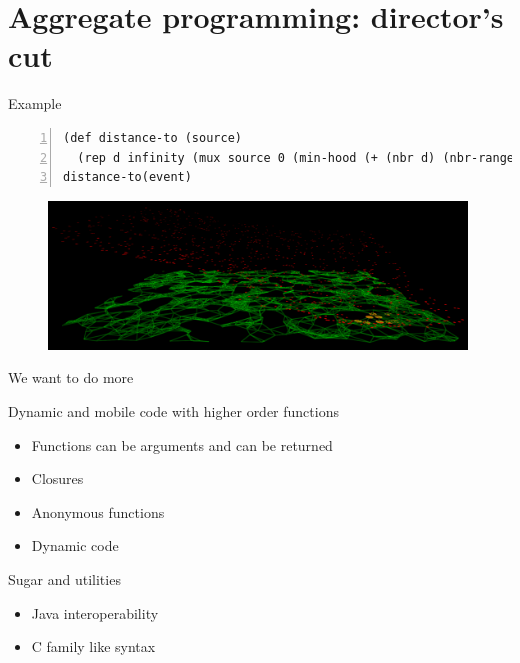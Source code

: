 \documentclass[presentation]{beamer}\mode<presentation>{\usetheme{sapere}}
\begin{document}
\section*{Aggregate programming: director's cut}

\begin{frame}[fragile]{Example}
    \scriptsize
    \begin{lstlisting}[mathescape,morekeywords={rep,mux,sense,inf,def,min,hood,nbr,nbr,range,else,if,Infinity},numbers=left,basicstyle=\ttfamily]
(def distance-to (source)
  (rep d infinity (mux source 0 (min-hood (+ (nbr d) (nbr-range))))))
distance-to(event)
    \end{lstlisting}
  \centering
  \begin{figure}
    \includegraphics[width=0.99\textwidth]{imgs/grad} 
  \end{figure}
\end{frame}

\begin{frame}{We want to do more}
  \begin{block} {Dynamic and mobile code with higher order functions}
   \begin{itemize}
    \item Functions can be arguments and can be returned 
    \item Closures
    \item Anonymous functions
    \item Dynamic code
   \end{itemize}
  \end{block}
  \begin{block} {Sugar and utilities}
   \begin{itemize}
    \item Java interoperability
    \item C family like syntax
   \end{itemize}
  \end{block}
\end{frame}
\end{document}
